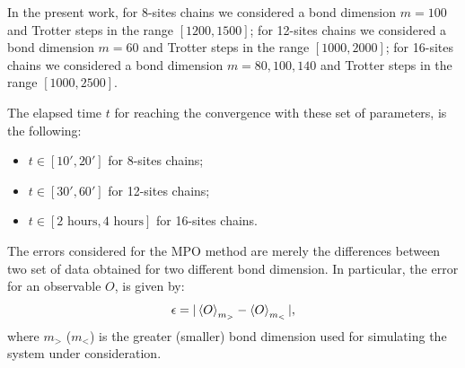 In the present work, for 8-sites chains we considered a bond dimension $m = 100$ and Trotter steps in the range $[1200, 1500]$; for 12-sites chains we considered a bond dimension $m = 60$ and Trotter steps in the range $[1000, 2000]$; for 16-sites chains we considered a bond dimension $m = 80, 100, 140$ and Trotter steps in the range $[1000, 2500]$.

The elapsed time $t$ for reaching the convergence with these set of parameters, is the following:
\begin{itemize}
    \item $t \in [10', 20']$ for 8-sites chains;
    \item $t \in [30', 60']$ for 12-sites chains;
    \item $t \in [2 \text{ hours}, 4 \text{ hours}]$ for 16-sites chains.
\end{itemize}

The errors considered for the MPO method are merely the differences between two set of data obtained for two different bond dimension. In particular, the error for an observable $O$, is given by:
\begin{equation*}
    \epsilon = |\braket{O}_{m_>} - \braket{O}_{m_<}|,
\end{equation*}
where $m_>$ ($m_<$) is the greater (smaller) bond dimension used for simulating the system under consideration.

